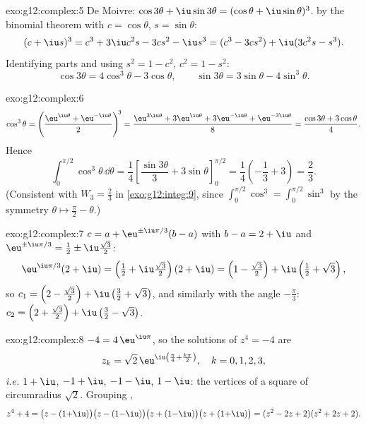 \begin{solution}{exo:g12:complex:5}
De Moivre: $\cos3\theta + \iu\sin3\theta = (\cos\theta + \iu\sin\theta)^3$.
 by the binomial theorem with $c = \cos\theta$, $s = \sin\theta$:
\[
(c + \iu s)^3 = c^3 + 3\iu c^2 s - 3 c s^2 - \iu s^3
= (c^3 - 3cs^2) + \iu(3c^2 s - s^3).
\]
Identifying parts and using $s^2 = 1 - c^2$, $c^2 = 1 - s^2$:
\[
\cos3\theta = 4\cos^3\theta - 3\cos\theta,
\qquad
\sin3\theta = 3\sin\theta - 4\sin^3\theta .
\]
\end{solution}

\begin{solution}{exo:g12:complex:6}
\[
\cos^3\theta = \left(\frac{\eu^{\iu\theta} + \eu^{-\iu\theta}}{2}\right)^{\!3}
= \frac{\eu^{3\iu\theta} + 3\eu^{\iu\theta} + 3\eu^{-\iu\theta} + \eu^{-3\iu\theta}}{8}
= \frac{\cos3\theta + 3\cos\theta}{4}.
\]
Hence
\[
\int_0^{\pi/2}\cos^3\theta\,\dd\theta
= \frac14\left[\frac{\sin3\theta}{3} + 3\sin\theta\right]_0^{\pi/2}
= \frac14\left(-\frac13 + 3\right) = \frac{2}{3}.
\]
(Consistent with $W_3 = \frac23$ in \cref{exo:g12:integ:9}, since
$\int_0^{\pi/2}\cos^3 = \int_0^{\pi/2}\sin^3$ by the symmetry
$\theta \mapsto \frac\pi2 - \theta$.)
\end{solution}

\begin{solution}{exo:g12:complex:7}
$c = a + \eu^{\pm\iu\pi/3}(b - a)$ with $b - a = 2 + \iu$ and
$\eu^{\pm\iu\pi/3} = \frac12 \pm \iu\frac{\sqrt3}{2}$:
\[
\eu^{\iu\pi/3}(2+\iu) = \left(\tfrac12 + \iu\tfrac{\sqrt3}{2}\right)(2+\iu)
= \left(1 - \tfrac{\sqrt3}{2}\right) + \iu\left(\tfrac12 + \sqrt3\right),
\]
so $c_1 = \left(2 - \frac{\sqrt3}{2}\right) +
\iu\left(\frac32 + \sqrt3\right)$, and similarly with the angle
$-\frac\pi3$:
$c_2 = \left(2 + \frac{\sqrt3}{2}\right) + \iu\left(\frac32 - \sqrt3\right)$.
\end{solution}

\begin{solution}{exo:g12:complex:8}
$-4 = 4\,\eu^{\iu\pi}$, so the solutions of $z^4 = -4$ are
\[
z_k = \sqrt2\,\eu^{\iu\left(\frac\pi4 + \frac{k\pi}{2}\right)},
\quad k = 0, 1, 2, 3,
\]
\emph{i.e.} $1 + \iu$, $-1 + \iu$, $-1 - \iu$, $1 - \iu$: the vertices of a
square of circumradius $\sqrt 2$. Grouping  ,
\[
z^4 + 4 = \bigl(z - (1{+}\iu)\bigr)\bigl(z - (1{-}\iu)\bigr)
\bigl(z + (1{-}\iu)\bigr)\bigl(z + (1{+}\iu)\bigr)
= (z^2 - 2z + 2)(z^2 + 2z + 2).
\]
\end{solution}

